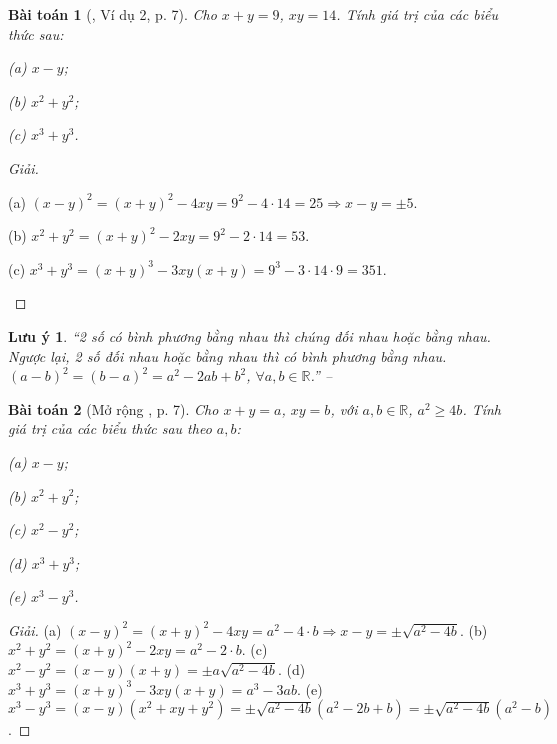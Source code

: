 \documentclass{article}
\numberwithin{equation}{section}
\newtheorem{baitoan}{Bài toán}
\newtheorem{luuy}{Lưu ý}[section]
\begin{document}
\begin{baitoan}[\cite{Tuyen_Toan_8}, Ví dụ 2, p. 7]
	Cho $x + y = 9$, $xy = 14$. Tính giá trị của các biểu thức sau:
	\begin{enumerate*}
		\item[(a)] $x - y$;
		\item[(b)] $x^2 + y^2$;
		\item[(c)] $x^3 + y^3$.
	\end{enumerate*}
\end{baitoan}

\begin{proof}[Giải]
	\begin{enumerate*}
		\item[(a)] $(x - y)^2 = (x + y)^2 - 4xy = 9^2 - 4\cdot14 = 25\Rightarrow x - y = \pm5$.
		\item[(b)] $x^2 + y^2 = (x + y)^2 - 2xy = 9^2 - 2\cdot14 = 53$.
		\item[(c)] $x^3 + y^3 = (x + y)^3 - 3xy(x + y) = 9^3 - 3\cdot14\cdot9 = 351$.
	\end{enumerate*}
\end{proof}

\begin{luuy}
	``2 số có bình phương bằng nhau thì chúng đối nhau hoặc bằng nhau. Ngược lại, 2 số đối nhau hoặc bằng nhau thì có bình phương bằng nhau. $(a - b)^2 = (b - a)^2 = a^2 - 2ab + b^2$, $\forall a,b\in\mathbb{R}$.'' -- \cite[p. 8]{Tuyen_Toan_8}
\end{luuy}

\begin{baitoan}[Mở rộng \cite{Tuyen_Toan_8}, p. 7]
	Cho $x + y = a$, $xy = b$, với $a,b\in\mathbb{R}$, $a^2\ge 4b$. Tính giá trị của các biểu thức sau theo $a,b$:
	\begin{enumerate*}
		\item[(a)] $x - y$;
		\item[(b)] $x^2 + y^2$;
		\item[(c)] $x^2 - y^2$;
		\item[(d)] $x^3 + y^3$;
		\item[(e)] $x^3 - y^3$.
	\end{enumerate*}
\end{baitoan}

\begin{proof}[Giải]
	(a) $(x - y)^2 = (x + y)^2 - 4xy = a^2 - 4\cdot b\Rightarrow x - y = \pm\sqrt{a^2 - 4b}$. (b) $x^2 + y^2 = (x + y)^2 - 2xy = a^2 - 2\cdot b$. (c) $x^2 - y^2 = (x - y)(x + y) = \pm a\sqrt{a^2 - 4b}$. (d) $x^3 + y^3 = (x + y)^3 - 3xy(x + y) = a^3 - 3ab$. (e) $x^3 - y^3 = (x - y)(x^2 + xy + y^2) = \pm\sqrt{a^2 - 4b}(a^2 - 2b + b) = \pm\sqrt{a^2 - 4b}(a^2 - b)$.
\end{proof}
\end{document}
